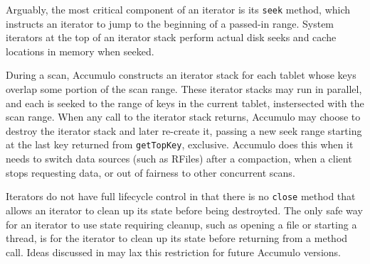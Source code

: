 Arguably, the most critical component of an iterator is its \texttt{seek} method,
which instructs an iterator to jump to the beginning of a passed-in range. System iterators 
at the top of an iterator stack perform actual disk seeks and cache locations in memory when seeked.

During a scan, Accumulo constructs an iterator stack for each tablet whose keys overlap some portion 
of the scan range. These iterator stacks may run in parallel, and each is seeked to the range of 
keys in the current tablet, instersected with the scan range. When any call to the iterator stack 
returns, Accumulo may choose to destroy the iterator stack and later re-create it,
passing a new seek range starting at the last key returned from \texttt{getTopKey}, exclusive.
Accumulo does this when it needs to switch data sources (such as RFiles) after a compaction, 
when a client stops requesting data, or out of fairness to other concurrent scans.

Iterators do not have full lifecycle control in that there is no \texttt{close} method 
that allows an iterator to clean up its state before being destroyted. The only safe way for an 
iterator to use state requiring cleanup, such as opening a file or starting a thread,
is for the iterator to clean up its state before returning from a method call.
Ideas discussed in \cite{ACCUMULO-3751} may lax this restriction for future Accumulo versions.


